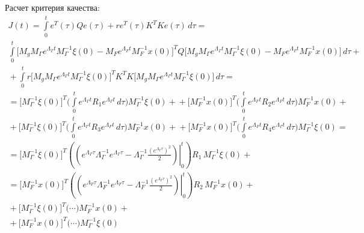 Расчет критерия качества:
\begin{gather*}\textstyle
	J(t) = 	\int\limits_0^t e^T(\tau) Q e(\tau) + r e^T(\tau) K^T K e(\tau) \,d\tau =
	\\
	 \int\limits_0^t \bigl[M_g M_\Gamma e^{\Lambda_\Gamma t} M_\Gamma^{-1} \xi(0) - M_F e^{\Lambda_F t} M_F^{-1} x(0) \bigr]^T Q \bigl[ M_g M_\Gamma e^{\Lambda_\Gamma t} M_\Gamma^{-1} \xi(0) - M_F e^{\Lambda_F t} M_F^{-1} x(0) \bigr] \,d\tau + {}
	\\
	{} + \int\limits_0^t r \bigl[ M_g M_\Gamma e^{\Lambda_\Gamma t} M_\Gamma^{-1} \xi(0) \bigl]^T  K^T K  \bigl[ M_g M_\Gamma e^{\Lambda_\Gamma t} M_\Gamma^{-1} \xi(0) \bigl] \,d\tau = {}
	\\
	{} = \bigl[ M_\Gamma^{-1} \xi(0) \bigl]^T \Biggl( \int\limits_0^t e^{\Lambda_\Gamma t} R_1 e^{\Lambda_\Gamma t} \,d\tau \Biggl) M_\Gamma^{-1} \xi(0)  + {}
	{} + \bigl[ M_F^{-1} x(0) \bigl]^T \Biggl( \int\limits_0^t e^{\Lambda_F t} R_2 e^{\Lambda_F t} \,d\tau \Biggl) M_F^{-1} x(0)  + {}
	\\
	{} + \bigl[ M_\Gamma^{-1} \xi(0) \bigl]^T \Biggl( \int\limits_0^t e^{\Lambda_\Gamma t} R_3 e^{\Lambda_F t} \,d\tau \Biggl) M_F^{-1} x(0)  + {}
	{} + \bigl[ M_F^{-1} x(0) \bigl]^T \Biggl( \int\limits_0^t e^{\Lambda_F t} R_4 e^{\Lambda_\Gamma t} \,d\tau \Biggl) M_\Gamma^{-1} \xi(0)  = {}
	\\
	{} = \bigl[ M_\Gamma^{-1} \xi(0) \bigr]^T \left(  \left. \left( e^{\Lambda_\Gamma \tau} \Lambda_\Gamma^{-1} e^{\Lambda_\Gamma \tau} - \Lambda_\Gamma^{-1} \frac{(e^{\Lambda_\Gamma \tau})^2}{2} \right)\right|^t_0 \right) R_1\, M_\Gamma^{-1} \xi(0) + {}
	\\
	{} = \bigl[ M_F^{-1} x(0) \bigr]^T \left(  \left. \left( e^{\Lambda_F \tau} \Lambda_F^{-1} e^{\Lambda_F \tau} - \Lambda_F^{-1} \frac{(e^{\Lambda_F \tau})^2}{2} \right)\right|^t_0 \right) R_2\, M_F^{-1} x(0) + {}
	\\
	{} + \bigl[ M_\Gamma^{-1} \xi(0) \bigl]^T \Biggl( \cdots \Biggl) M_F^{-1} x(0)  + {}
	\\
	{} + \bigl[ M_F^{-1} x(0) \bigl]^T \Biggl( \cdots \Biggl) M_\Gamma^{-1} \xi(0)
\end{gather*}
